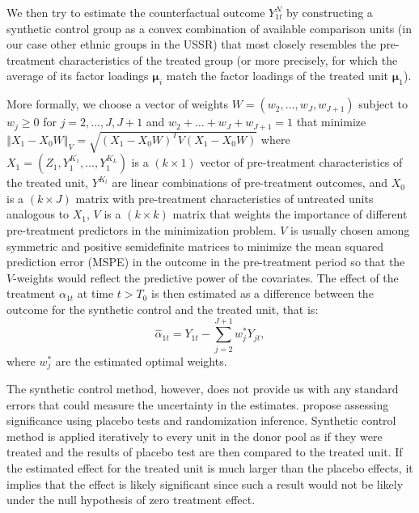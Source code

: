 We then try to estimate the counterfactual outcome $Y_{1t}^N$  by constructing a synthetic control group  as a convex combination of available comparison units (in our case other ethnic groups in the USSR) that most closely resembles the pre-treatment characteristics of the treated group
 (or more precisely, for which the average of its factor loadings $\boldsymbol{\mu}_i$ match the factor loadings of the treated unit  $\boldsymbol{\mu}_1$). 
 
 
 More formally, we choose a vector of weights $W = (w_2, \dots, w_J, w_{J+1})$ subject to $w_j \geq 0$ for $j = 2, \dots, J, J + 1$ and $w_2 +  \dots + w_J + w_{J+1} = 1$ that minimize $\left\Vert X_1 - X_0 W \right\Vert_V = \sqrt{\left(X_1 - X_0 W\right)^T V \left(X_1 - X_0 W\right)}$ where
  $X_1 = (Z_1, Y_1^{K_1}, \dots, Y_1^{K_L})$ is a $(k \times 1)$ vector of pre-treatment characteristics of the treated unit,  $Y^{K_l}$ are linear combinations of
pre-treatment outcomes, and %
  $X_0$ is a $(k \times J)$ matrix with pre-treatment characteristics of untreated units analogous to $X_1$, 
  $V$ is  a $(k \times k)$  matrix that weights the importance of different pre-treatment predictors in the minimization problem. 
  $V$ is usually chosen among symmetric and positive semidefinite matrices to minimize the  mean squared prediction error (MSPE) in the outcome in the pre-treatment period so that the $V$-weights would reflect the predictive power of the covariates. 
The effect of the treatment $\alpha_{1t}$ at time $t > T_0$ is then estimated as a difference between the outcome for the synthetic control and the treated unit, that is:
\begin{equation}
  \hat\alpha_{1t}  = Y_{1t} - \sum_{j = 2}^{J + 1} w_j^* Y_{jt},
\end{equation}
where $w^*_j$ are the estimated optimal weights. 

The synthetic control method, however, does not provide us with any standard errors that could measure the uncertainty in the estimates.
\citet{abadie_synthetic_2010} propose assessing significance  using  placebo tests and randomization inference. Synthetic control method is applied iteratively to every unit in the donor pool as if they were treated and the results of placebo test are then compared to the treated unit. If the estimated effect for the treated unit is much larger than the placebo effects, it implies that the effect is likely significant since 
such a result would not be likely under the null hypothesis of zero treatment effect.

